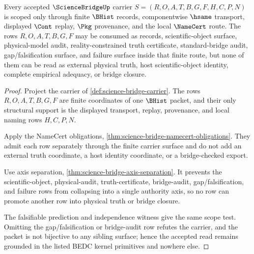 \begin{theorem}
\label{thm:science-bridge-kernel-scope-grounding}
Every accepted $\ScienceBridgeUp$ carrier $S=(R,O,A,T,B,G,F,H,C,P,N)$ is scoped only through finite $\BHist$ records, componentwise $\hsame$ transport, displayed $\Cont$ replay, $\Pkg$ provenance, and the local $\NameCert$ route. The rows $R,O,A,T,B,G,F$ may be consumed as records, scientific-object surface, physical-model audit, reality-constrained truth certificate, standard-bridge audit, gap/falsification surface, and failure surface inside that finite route, but none of them can be read as external physical truth, host scientific-object identity, complete empirical adequacy, or bridge closure.
\end{theorem}
\begin{proof}
Project the carrier of \autoref{def:science-bridge-carrier}. The rows $R,O,A,T,B,G,F$ are finite coordinates of one $\BHist$ packet, and their only structural support is the displayed transport, replay, provenance, and local naming rows $H,C,P,N$.

Apply the NameCert obligations, \autoref{thm:science-bridge-namecert-obligations}. They admit each row separately through the finite carrier surface and do not add an external truth coordinate, a host identity coordinate, or a bridge-checked export.

Use axis separation, \autoref{thm:science-bridge-axis-separation}. It prevents the scientific-object, physical-audit, truth-certificate, bridge-audit, gap/falsification, and failure rows from collapsing into a single authority axis, so no row can promote another row into physical truth or bridge closure.

The falsifiable prediction and independence witness give the same scope test. Omitting the gap/falsification or bridge-audit row refutes the carrier, and the packet is not bijective to any sibling surface; hence the accepted read remains grounded in the listed BEDC kernel primitives and nowhere else.
\end{proof}



